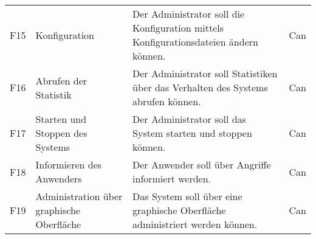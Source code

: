 \documentclass[../review_3.tex]{subfiles}
\begin{document}
\begin{longtable} [h] {p{1cm} p{4cm} p{7cm} l}
    F15                                                                                                                                                                                                              & Konfiguration                                  & Der Administrator soll die Konfiguration mittels Konfigurationsdateien ändern können.                                                                                                                                                                   & Can             \\
    F16                                                                                                                                                                                                              & Abrufen der Statistik                          & Der Administrator soll Statistiken über das Verhalten des Systems abrufen können.                                                                                                                                                                       & Can             \\
    F17                                                                                                                                                                                                              & Starten und Stoppen des Systems                & Der Administrator soll das System starten und stoppen können.                                                                                                                                                                                           & Can             \\
    F18                                                                                                                                                                                                              & Informieren des Anwenders                      & Der Anwender soll über Angriffe informiert werden.                                                                                                                                                                                                      & Can             \\
    F19                                                                                                                                                                                                              & Administration über graphische Oberfläche      & Das System soll über eine graphische Oberfläche administriert werden können.                                                                                                                                                                            & Can             \\

\end{longtable}
\end{document}
